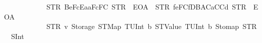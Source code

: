 \begin{isabellebody}
\ \ \ \ \ \ \ \ \ \ \ \ {\isacharbrackleft}{\kern0pt}{\isacharparenleft}{\kern0pt}STR\ {\isacharprime}{\kern0pt}{\isacharprime}{\kern0pt}{}{}{}Be{}{}{}{}FcEa{}{}aF{}{}{}{}{}{}{}{}{}c{}{}F{}{}{}{}{}{}C{}{}{}{\isacharprime}{\kern0pt}{\isacharprime}{\kern0pt}{\isacharcomma}{\kern0pt}\ STR\ {\isacharprime}{\kern0pt}{\isacharprime}{\kern0pt}{}{}{}{\isacharprime}{\kern0pt}{\isacharprime}{\kern0pt}{\isacharcomma}{\kern0pt}\ EOA{\isacharcomma}{\kern0pt}\ {}{\isacharparenright}{\kern0pt}{\isacharcomma}{\kern0pt}\ {\isacharparenleft}{\kern0pt}STR\ {\isacharprime}{\kern0pt}{\isacharprime}{\kern0pt}{}{}{}f{}e{}F{}{}{}{}{}C{}{}f{}DB{}AC{}{}{}{}{}a{}CC{}{}{}{}{}d{}{}{\isacharprime}{\kern0pt}{\isacharprime}{\kern0pt}{\isacharcomma}{\kern0pt}\ STR\ {\isacharprime}{\kern0pt}{\isacharprime}{\kern0pt}{}{}{}{\isacharprime}{\kern0pt}{\isacharprime}{\kern0pt}{\isacharcomma}{\kern0pt}\ EOA{\isacharcomma}{\kern0pt}\ {}{\isacharparenright}{\kern0pt}{\isacharbrackright}{\kern0pt}\isanewline
\ \ \ \ \ \ \ \ \ \ \ \ {\isacharbrackleft}{\kern0pt}{\isacharparenleft}{\kern0pt}STR\ {\isacharprime}{\kern0pt}{\isacharprime}{\kern0pt}v{}{\isacharprime}{\kern0pt}{\isacharprime}{\kern0pt}{\isacharcomma}{\kern0pt}\ {\isacharparenleft}{\kern0pt}Storage\ {\isacharparenleft}{\kern0pt}STMap\ {\isacharparenleft}{\kern0pt}TUInt\ b{}{}{\isacharparenright}{\kern0pt}\ {\isacharparenleft}{\kern0pt}STValue\ {\isacharparenleft}{\kern0pt}TUInt\ b{}{\isacharparenright}{\kern0pt}{\isacharparenright}{\kern0pt}{\isacharparenright}{\kern0pt}{\isacharcomma}{\kern0pt}\ Stomap\ {\isacharbrackleft}{\kern0pt}{\isacharparenleft}{\kern0pt}STR\ {\isacharprime}{\kern0pt}{\isacharprime}{\kern0pt}{}{}{}{}{}{}{}{}{}{}{\isacharprime}{\kern0pt}{\isacharprime}{\kern0pt}{\isacharcomma}{\kern0pt}\ SInt\ {}{}{}{\isacharparenright}{\kern0pt}{\isacharbrackright}{\kern0pt}{\isacharparenright}{\kern0pt}{\isacharparenright}{\kern0pt}{\isacharbrackright}{\kern0pt}\isanewline

\end{isabellebody}
